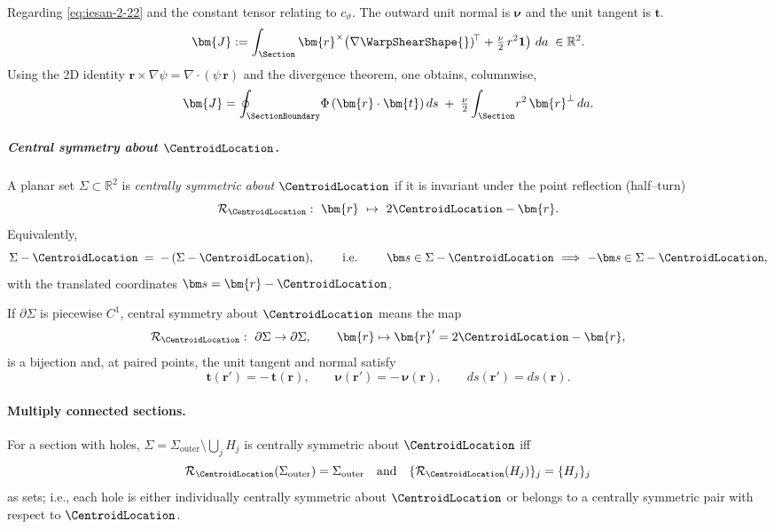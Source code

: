\begin{Quote}
Regarding \eqref{eq:iesan-2-22} and the constant tensor relating to \(c_{\vartheta}\). 
The outward unit normal is $\bm{\nu}$ and the unit tangent is $\bm{t}$.
\[
\bm{J}
:=\int_{\Section}\bm{r}^\times\!\left(\nabla\WarpShearShape{})^{\!\top}
+\tfrac{\nu}{2}\,r^2\mathbf{1}\right)\,da
\;\in\mathbb{R}^{2}.
\]
Using the 2D identity \(\bm{r}\times\nabla\psi=\nabla\cdot(\psi\,\bm{r})\)
and the divergence theorem, one obtains, columnwise,
\begin{equation}
\bm{J}
= \oint_{\SectionBoundary}\!\Phi\,(\bm{r}\cdot\bm{t})\,ds
\;+\;\tfrac{\nu}{2}\int_{\Section}\! r^{2}\,\bm{r}^\perp\,da.
\label{eq:J-boundary-form}
\end{equation}

\subparagraph{Central symmetry about \(\CentroidLocation\).}
A planar set \(\Sigma\subset\mathbb R^2\) is \emph{centrally symmetric about \(\CentroidLocation\)} if it is invariant under the point reflection (half–turn)
\[
\mathcal R_{\CentroidLocation}:\ \bm{r}\ \mapsto\ 2\CentroidLocation-\bm{r}.
\]
Equivalently,
\[
\Sigma-\CentroidLocation \;=\; -\,(\Sigma-\CentroidLocation),
\qquad\text{ i.e. }\qquad
\bm s\in\Sigma-\CentroidLocation\ \Longrightarrow\ -\bm s\in\Sigma-\CentroidLocation,
\]
with the translated coordinates \(\bm s=\bm{r}-\CentroidLocation\).

If \(\partial\Sigma\) is piecewise \(C^1\), central symmetry about \(\CentroidLocation\) means the map
\[
\mathcal R_{\CentroidLocation}:\ \partial\Sigma\to\partial\Sigma,\qquad
\bm{r}\mapsto\bm{r}' = 2\CentroidLocation-\bm{r},
\]
is a bijection and, at paired points, the unit tangent and normal satisfy
\[
\bm t(\bm{r}')=-\,\bm t(\bm{r}),\qquad
\bm\nu(\bm{r}')=-\,\bm\nu(\bm{r}),\qquad
ds(\bm{r}')=ds(\bm{r}).
\]

\paragraph{Multiply connected sections.}
For a section with holes, \(\Sigma=\Sigma_{\text{outer}}\setminus\bigcup_{j} H_j\) is centrally symmetric about \(\CentroidLocation\) iff
\[
\mathcal R_{\CentroidLocation}(\Sigma_{\text{outer}})=\Sigma_{\text{outer}}
\quad\text{and}\quad
\{\mathcal R_{\CentroidLocation}(H_j)\}_j=\{H_j\}_j
\]
as sets; i.e., each hole is either individually centrally symmetric about \(\CentroidLocation\) or belongs to a centrally symmetric pair with respect to \(\CentroidLocation\).


\end{Quote}
